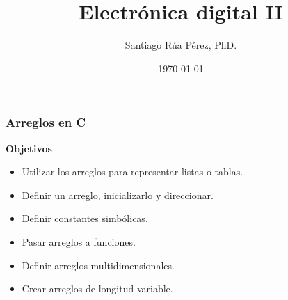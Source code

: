 \documentclass[10.5pt,scale=1.0,t,aspectratio=169,hyperref={pdfpagelabels=false}]{beamer}
\title{Electrónica digital II}
\author{Santiago Rúa Pérez, PhD.}
\date{\today}
\begin{document}
	\begin{frame}
		\titlepage
	\end{frame}
	\frame{
		\begin{center}
			\LARGE \textcolor{blue}{ARREGLOS EN C}
		\end{center}
		
	}

\begin{frame}
	\frametitle{Arreglos en C}
	{\bf Objetivos}
	\begin{itemize}
	\item Utilizar los arreglos para representar listas o tablas.
	\item Definir un arreglo, inicializarlo y direccionar.
	\item Definir constantes simbólicas.
	\item Pasar arreglos a funciones.
	\item Definir arreglos multidimensionales.
	\item Crear arreglos de longitud variable.
	\end{itemize}
\end{frame}
\end{document}

